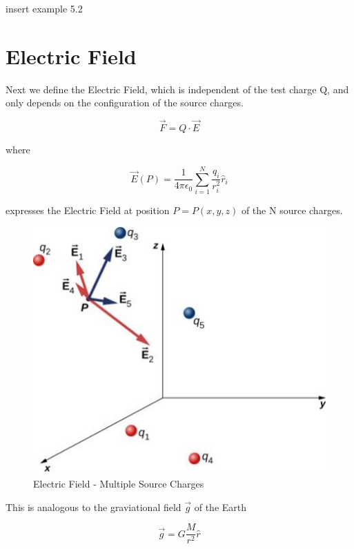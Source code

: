 \documentclass[14pt]{memoir}
\begin{document}
insert example 5.2

\section{Electric Field}

Next we define the Electric Field, which is independent of the test charge Q, and only depends on the configuration of the source charges. 

\begin{equation}
\vec{F} = Q \cdot \vec{E}
\end{equation}

where 

\begin{equation}
\vec{E}(P) = \frac{1}{4 \pi \epsilon_0} \sum_{i=1}^{N}\frac{q_i}{r_i^2}\hat{r}_i
\end{equation}

expresses the Electric Field at position $P = P(x,y,z)$ of the N source charges. 

\begin{figure}[h]
\begin{center}
\includegraphics[scale=0.60]{fig/fig_05_18.jpg}
\caption{Electric Field - Multiple Source Charges}
\label{fig:05_18}
\end{center}
\end{figure}


This is analogous to the graviational field $\vec{g}$ of the Earth

\begin{equation}
\vec{g} = G \frac{M}{r^2}\hat{r}
\end{equation}
\end{document}
